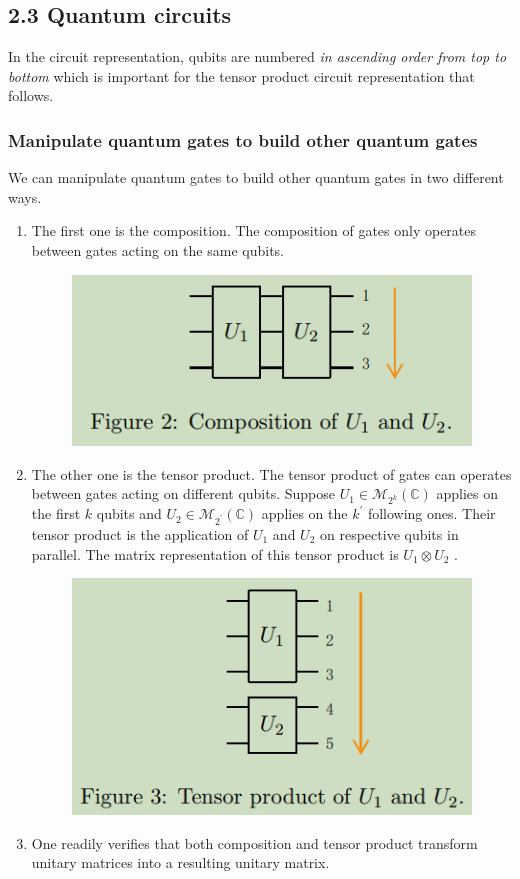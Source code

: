 \subsection{2.3 Quantum circuits}

In the circuit representation, qubits are numbered \textit{in ascending order from top to bottom} which is important for the tensor product circuit representation that follows. %

\subsubsection{Manipulate quantum gates to build other quantum gates}

We can manipulate quantum gates to build other quantum gates in two different ways. 
\begin{enumerate}
    \item The first one is the composition. The composition of gates only operates between gates acting on the same qubits. 
\begin{figure}
    \centering
    \includegraphics[width=0.5\linewidth]{Images/grange2023-1.png}
\end{figure}
    \item The other one is the tensor product. The tensor product of gates can operates between gates acting on different qubits. Suppose $U_{1} \in \mathcal{M}_{2^{k}}(\mathbb{C})$ applies on the first $k$ qubits and $U_{2} \in \mathcal{M}_{2^{\prime}}(\mathbb{C})$ applies on the $k^{\prime}$ following ones. Their tensor product is the application of $U_{1}$ and $U_{2}$ on respective qubits in parallel. The matrix representation of this tensor product is $U_{1} \otimes U_{2}$ . 
\begin{figure}
    \centering
    \includegraphics[width=0.5\linewidth]{Images/grange2023-2.png}
\end{figure}
    \item One readily verifies that both composition and tensor product transform unitary matrices into a resulting unitary matrix.
\end{enumerate}

